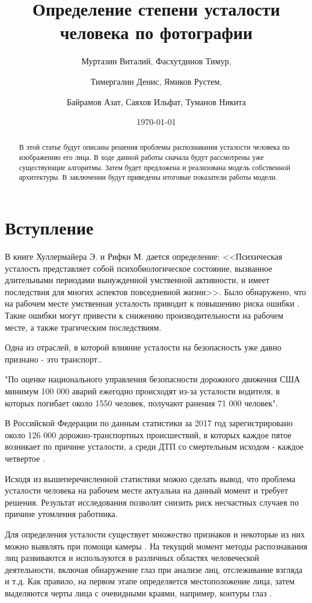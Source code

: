 \documentclass[12pt, letterpaper]{article}
\title{Определение степени усталости человека по фотографии}
\date{\today}
\author{Муртазин Виталий, Фасхутдинов Тимур, \and
Тимергалин Денис, Ямиков Рустем, \and
Байрамов Азат, Саяхов Ильфат, Туманов Никита
}
\begin{document}
    \maketitle

    \begin{abstract}
        В этой статье будут описаны решения проблемы распознавания усталости человека по изображению его лица.
        В ходе данной работы сначала будут рассмотрены уже существующие алгоритмы.
        Затем будет предложена и реализована модель собственной архитектуры.
        В заключении будут приведены итоговые показатели работы модели.
    \end{abstract}

    \section{Вступление}\label{sec:introduction}
    В книге Хуллермайера Э. и Рифки М. дается определение: <<Психическая усталость представляет собой психобиологическое состояние, вызванное длительными периодами вынужденной умственной активности, и имеет последствия для многих аспектов повседневной жизни>>\cite{hullermeier_fuzzy_2009}.
    Было обнаружено, что на рабочем месте умственная усталость приводит к повышению риска ошибки \cite{__nodate}.
    Такие ошибки могут привести к снижению производительности на рабочем месте, а также трагическим последствиям.

    Одна из отраслей, в которой влияние усталости на безопасность уже давно признано - это транспорт.\cite{phillips_fatigue_2017}.
    
    "По оценке национального управления безопасности дорожного движения США минимум 100 000 аварий ежегодно происходят из-за усталости водителя, в которых погибает около 1550 человек, получают ранения 71 000 человек"\cite{qiang_ji_real-time_2004}.

    В Российской Федерации по данным статистики за 2017 год зарегистрировано около 126 000 дорожно-транспортных происшествий, в которых каждое пятое возникает по причине усталости, а среди ДТП со смертельным исходом - каждое четвертое \cite{__2018}.

    Исходя из вышеперечисленной статистики можно сделать вывод, что проблема усталости человека на рабочем месте актуальна на данный момент и требует решения.
    Результат исследования позволит снизить риск несчастных случаев по причине утомления работника.

    Для определения усталости существует множество признаков и некоторые из них можно выявлять при помощи камеры \cite{singh_monitoring_1999}.
    На текущий момент методы распознавания лиц развиваются и используются в различных областях человеческой деятельности, включая обнаружение глаз при анализе лиц, отслеживание взгляда и т.д.
    Как правило, на первом этапе определяется местоположение лица, затем выделяются черты лица с очевидными краями, например, контуры глаз \cite{wen-bing_horng_driver_2004}.
\end{document}
